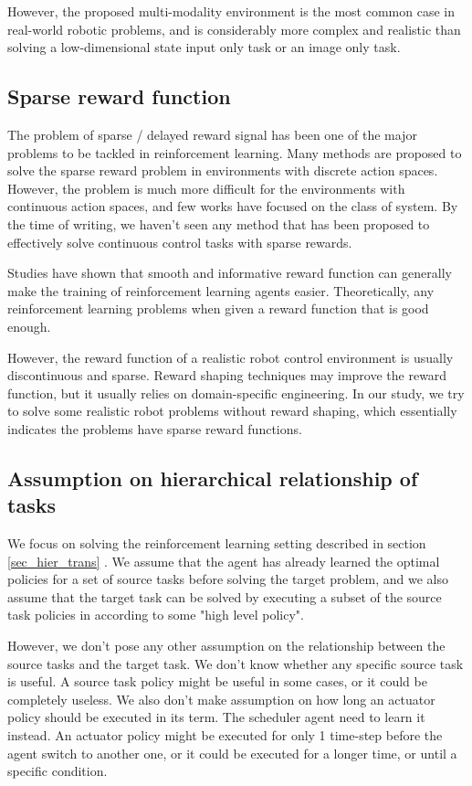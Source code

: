 However, the proposed multi-modality environment is the most common case in real-world robotic problems, and is considerably more complex and realistic than solving a low-dimensional state input only task or an image only task.


\subsection{Sparse reward function}
The problem of sparse / delayed reward signal has been one of the major problems to be tackled in reinforcement learning. Many methods are proposed to solve the sparse reward problem in environments with discrete action spaces. However, the problem is much more difficult for the environments with continuous action spaces, and few works have focused on the class of system. By the time of writing, we haven't seen any method that has been proposed to effectively solve continuous control tasks with sparse rewards.

Studies have shown that smooth and informative reward function can generally make the training of reinforcement learning agents easier. Theoretically, any reinforcement learning problems when given a reward function that is good enough.

However, the reward function of a realistic robot control environment is usually discontinuous and sparse. Reward shaping techniques may improve the reward function, but it usually relies on domain-specific engineering. In our study, we try to solve some realistic robot problems without reward shaping, which essentially indicates the problems have sparse reward functions.


\subsection{Assumption on hierarchical relationship of tasks}
We focus on solving the reinforcement learning setting described in section \ref{sec_hier_trans} . We assume that the agent has already learned the optimal policies for a set of source tasks before solving the target problem, and we also assume that the target task can be solved by executing a subset of the source task policies in according to some "high level policy".

However, we don't pose any other assumption on the relationship between the source tasks and the target task. We don't know whether any specific source task is useful. A source task policy might be useful in some cases, or it could be completely useless. 
We also don't make assumption on how long an actuator policy should be executed in its term. The scheduler agent need to learn it instead. An actuator policy might be executed for only 1 time-step before the agent switch to another one, or it could be executed for a longer time, or until a specific condition.

